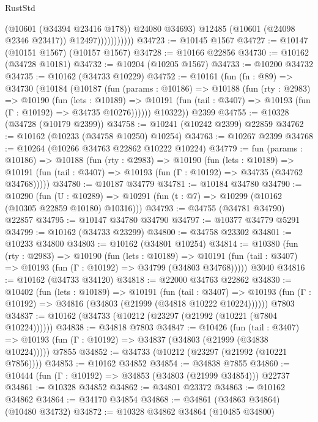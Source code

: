 \begin{lexlean}{RustStd}
\begin{coremodule}
                            (@10601 (@34394 @23416 @178))
                            @24080
                            @34693)
                          @12485
                          (@10601 (@24098 @2346 @23417))
                          @12497)))))))))))
@34723 := @10145 @1567
@34727 := @10147 (@10151 @1567) (@10157 @1567)
@34728 := @10166 @22856
@34730 := @10162 (@34728 @10181)
@34732 := @10204 (@10205 @1567)
@34733 := @10200 @34732
@34735 := @10162 (@34733 @10229)
@34752 := @10161
    (fun (fn : @89) =>
    @34730
      (@10184
        (@10187
          (fun (params : @10186) =>
          @10188
            (fun (rty : @2983) =>
            @10190
              (fun (lets : @10189) =>
              @10191 (fun (tail : @3407) => @10193 (fun (Γ : @10192) => @34735 @10276))))))
        @10322))
    @2399
@34755 := @10328 (@34728 (@10179 @2399))
@34758 := @10241 (@10242 @2399) @22859
@34762 := @10162 (@10233 (@34758 @10250) @10254)
@34763 := @10267 @2399
@34768 := @10264 (@10266 @34763 @22862 @10222 @10224)
@34779 := fun (params : @10186) =>
  @10188
    (fun (rty : @2983) =>
    @10190
      (fun (lets : @10189) =>
      @10191 (fun (tail : @3407) => @10193 (fun (Γ : @10192) => @34735 (@34762 @34768)))))
@34780 := @10187 @34779
@34781 := @10184 @34780
@34790 := @10290
    (fun (U : @10289) => @10291 (fun (t : @7) => @10299 (@10162 (@10305 @22859 @10180) @10316)))
@34793 := @34755 (@34781 @34790) @22857
@34795 := @10147 @34780 @34790
@34797 := @10377 @34779 @5291
@34799 := @10162 (@34733 @23299)
@34800 := @34758 @23302
@34801 := @10233 @34800
@34803 := @10162 (@34801 @10254)
@34814 := @10380
    (fun (rty : @2983) =>
    @10190
      (fun (lets : @10189) =>
      @10191 (fun (tail : @3407) => @10193 (fun (Γ : @10192) => @34799 (@34803 @34768)))))
    @3040
@34816 := @10162 (@34733 @34120)
@34818 := @22000 @34763 @22862
@34830 := @10402
    (fun (lets : @10189) =>
    @10191
      (fun (tail : @3407) =>
      @10193 (fun (Γ : @10192) => @34816 (@34803 (@21999 (@34818 @10222 @10224))))))
    @7803
@34837 := @10162 (@34733 (@10212 (@23297 (@21992 (@10221 (@7804 @10224))))))
@34838 := @34818 @7803
@34847 := @10426
    (fun (tail : @3407) => @10193 (fun (Γ : @10192) => @34837 (@34803 (@21999 (@34838 @10224)))))
    @7855
@34852 := @34733 (@10212 (@23297 (@21992 (@10221 @7856))))
@34853 := @10162 @34852
@34854 := @34838 @7855
@34860 := @10444 (fun (Γ : @10192) => @34853 (@34803 (@21999 @34854))) @22737
@34861 := @10328 @34852
@34862 := @34801 @23372
@34863 := @10162 @34862
@34864 := @34170 @34854
@34868 := @34861 (@34863 @34864) (@10480 @34732)
@34872 := @10328 @34862 @34864 (@10485 @34800)

\end{coremodule}
\end{lexlean}
